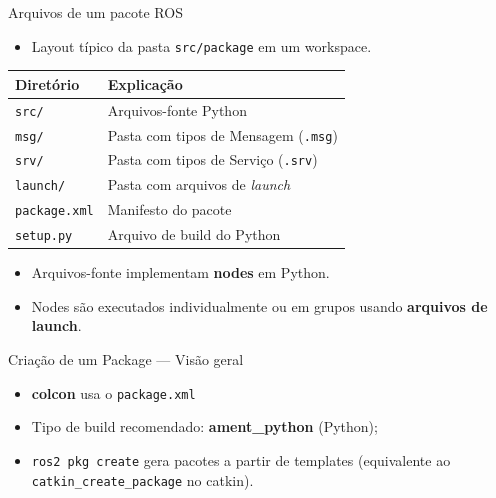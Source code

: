 \begin{frame}[fragile]{Arquivos de um pacote ROS}
  \begin{itemize}
    \item Layout típico da pasta \texttt{src/package} em um workspace.
  \end{itemize}

  \vspace{0.4em}

  \begin{center}
  \begin{tabular}{p{} p{}}
    \textbf{Diretório} & \textbf{Explicação} \\
    \hline
    \texttt{src/}           & Arquivos-fonte Python \\
    \texttt{msg/}           & Pasta com tipos de Mensagem (\texttt{.msg}) \\
    \texttt{srv/}           & Pasta com tipos de Serviço (\texttt{.srv}) \\
    \texttt{launch/}        & Pasta com arquivos de \emph{launch} \\
    \texttt{package.xml}    & Manifesto do pacote \\
    \texttt{setup.py}       & Arquivo de build do Python \\
  \end{tabular}
  \end{center}

  \vspace{0.6em}
  \begin{itemize}
    \item Arquivos-fonte implementam \textbf{nodes} em Python.
    \item Nodes são executados individualmente ou em grupos usando \textbf{arquivos de launch}.
  \end{itemize}
\end{frame}

\begin{frame}[fragile]{Criação de um Package — Visão geral}
  \begin{itemize}
    \item \textbf{colcon} usa o \texttt{package.xml}
    \item Tipo de build recomendado: \textbf{ament\_python} (Python);
    \item \texttt{ros2 pkg create} gera pacotes a partir de templates (equivalente ao \texttt{catkin\_create\_package} no catkin).
  \end{itemize}
\end{frame}

